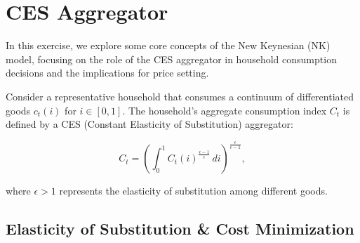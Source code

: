 \documentclass[dvipsnames,11pt]{article}
\begin{document}

% 

\section{CES Aggregator}

    In this exercise, we explore some core concepts of the New Keynesian (NK) model, focusing on the role of the CES aggregator in household consumption decisions and the implications for price setting. 

    Consider a representative household that consumes a continuum of differentiated goods \( c_t(i) \) for \( i \in [0,1] \). The household's aggregate consumption index \( C_t \) is defined by a CES (Constant Elasticity of Substitution) aggregator:
    
    \begin{equation}\label{eq:coba}
    C_t = \left( \int_0^1 C_t(i)^{\frac{\epsilon - 1}{\epsilon}} \, di \right)^{\frac{\epsilon}{\epsilon - 1}},
    \end{equation}
    
    where \( \epsilon > 1 \) represents the elasticity of substitution among different goods.
    
    \subsection{Elasticity of Substitution \& Cost Minimization}
\end{document}
